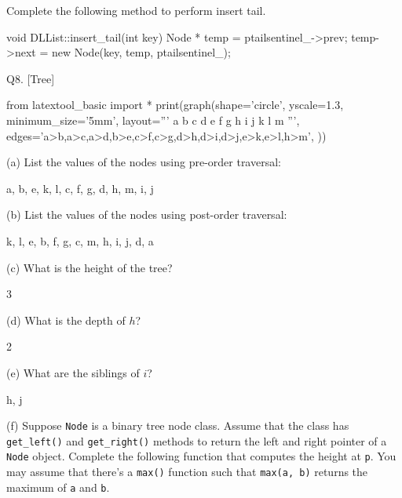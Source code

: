 Complete the following method to perform insert tail.

\ANSWER
\begin{answercode}
void DLList::insert_tail(int key)
{
  Node * temp = ptailsentinel_->prev;
  temp->next = new Node(key, temp, ptailsentinel_);
}
\end{answercode}




\newpage
Q8. [Tree]
\begin{python}
from latextool_basic import *
print(graph(shape='circle',
        yscale=1.3,
        minimum_size='5mm',
        layout='''
             a
         b   c   d
        e   f g h i j
       k l     m  
        ''',
        edges='a>b,a>c,a>d,b>e,c>f,c>g,d>h,d>i,d>j,e>k,e>l,h>m',
        ))
\end{python}

(a) List the values of the nodes using pre-order traversal:

\ANSWER
\begin{answercode}
a, b, e, k, l, c, f, g, d, h, m, i, j
\end{answercode}


(b) List the values of the nodes using post-order traversal:

\ANSWER
\begin{answercode}
k, l, e, b, f, g, c, m, h, i, j, d, a
\end{answercode}


(c) What is the height of the tree?

\ANSWER
\begin{answercode}
3
\end{answercode}


(d) What is the depth of $h$?

\ANSWER
\begin{answercode}
2
\end{answercode}


(e) What are the siblings of $i$?

\ANSWER
\begin{answercode}
h, j
\end{answercode}


(f) Suppose \verb!Node! is a binary tree node class.
Assume that the class has \verb!get_left()! and \verb!get_right()!
methods to return the left and right pointer of a \verb!Node!
object.
Complete the following function that computes the height at \verb!p!.
You may assume that there's a \verb!max()! function such that
\verb!max(a, b)! returns the maximum of \verb!a! and \verb!b!.

